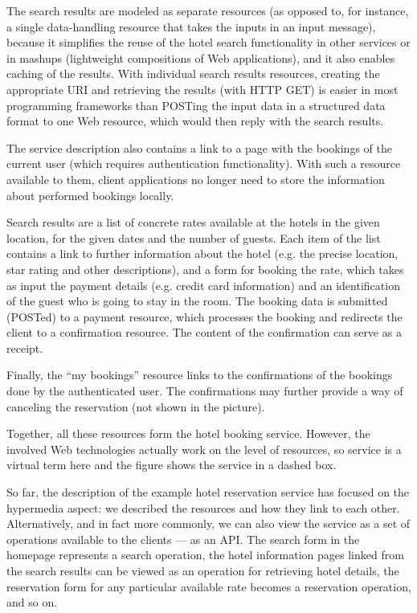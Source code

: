 \begin{spacing}{1.5}
The search results are modeled as separate resources (as opposed to, for instance, a single data-handling resource that takes the inputs in an input message), because it simplifies the reuse of the hotel search functionality in other services or in mashups (lightweight compositions of Web applications), and it also enables caching of the results. With individual search results resources, creating the appropriate URI and retrieving the results (with HTTP GET) is easier in most programming frameworks than POSTing the input data in a structured data format to one Web resource, which would then reply with the search results. 
            
The service description also contains a link to a page with the bookings of the current user (which requires authentication functionality). With such a resource available to them, client applications no longer need to store the information about performed bookings locally.

Search results are a list of concrete rates available at the hotels in the given location, for the given dates and the number of guests. Each item of the list contains a link to further information about the hotel (e.g. the precise location, star rating and other descriptions), and a form for booking the rate, which takes as input the payment details (e.g. credit card information) and an identification of the guest who is going to stay in the room. The booking data is submitted (POSTed) to a payment resource, which processes the booking and redirects the client to a confirmation resource. The content of the confirmation can serve as a receipt.
             
Finally, the “my bookings” resource links to the confirmations of the bookings done by the authenticated user. The confirmations may further provide a way of canceling the reservation (not shown in the picture). 
           
Together, all these resources form the hotel booking service. However, the involved Web technologies actually work on the level of resources, so service is a virtual term here and the figure shows the service in a dashed box. 
        
So far, the description of the example hotel reservation service has focused on the hypermedia aspect: we described the resources and how they link to each other. Alternatively, and in fact more commonly, we can also view the service as a set of operations available to the clients — as an API. The search form in the homepage represents a search operation, the hotel information pages linked from the search results can be viewed as an operation for retrieving hotel details, the reservation form for any particular available rate becomes a reservation operation, and so on. 
          

\end{spacing}
